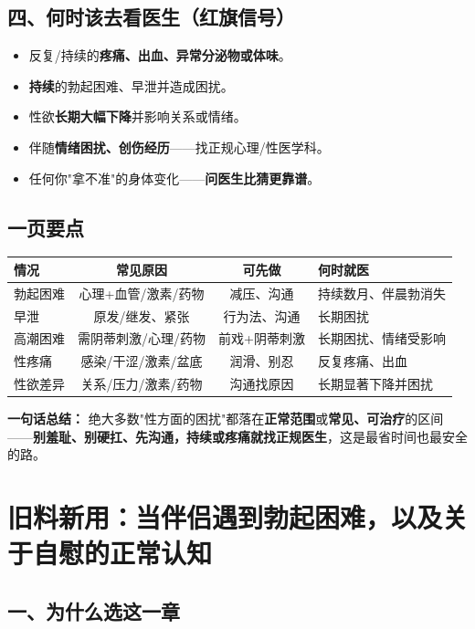\section{四、何时该去看医生（红旗信号）}

\begin{itemize}[leftmargin=2em,itemsep=0.3em]
  \item 反复/持续的\textbf{疼痛、出血、异常分泌物或体味}。
  \item \textbf{持续}的勃起困难、早泄并造成困扰。
  \item 性欲\textbf{长期大幅下降}并影响关系或情绪。
  \item 伴随\textbf{情绪困扰、创伤经历}——找正规心理/性医学科。
  \item 任何你"拿不准"的身体变化——\textbf{问医生比猜更靠谱}。
\end{itemize}

\section{一页要点}

\begin{tabularx}{\textwidth}{lCCX}
\toprule
情况 & 常见原因 & 可先做 & 何时就医 \\
\midrule
勃起困难 & 心理+血管/激素/药物 & 减压、沟通 & 持续数月、伴晨勃消失 \\
早泄 & 原发/继发、紧张 & 行为法、沟通 & 长期困扰 \\
高潮困难 & 需阴蒂刺激/心理/药物 & 前戏+阴蒂刺激 & 长期困扰、情绪受影响 \\
性疼痛 & 感染/干涩/激素/盆底 & 润滑、别忍 & 反复疼痛、出血 \\
性欲差异 & 关系/压力/激素/药物 & 沟通找原因 & 长期显著下降并困扰 \\
\bottomrule
\end{tabularx}

\vspace{1em}
\noindent\textbf{一句话总结：} 绝大多数"性方面的困扰"都落在\textbf{正常范围}或\textbf{常见、可治疗}的区间——\textbf{别羞耻、别硬扛、先沟通，持续或疼痛就找正规医生}，这是最省时间也最安全的路。

\chapter{旧料新用：当伴侣遇到勃起困难，以及关于自慰的正常认知}
\label{chap:partner-ed}

\section{一、为什么选这一章}

